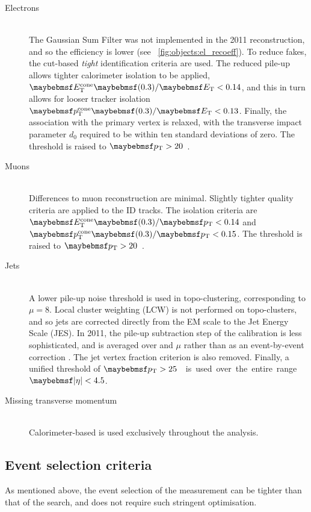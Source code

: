 \begin{description}
\item[Electrons] \hfill \\
	The Gaussian Sum Filter was not implemented in the 2011 reconstruction, and so the 
	efficiency is lower (see \Figure~\ref{fig:objects:el_recoeff}). To reduce fakes, the 
	cut-based \textit{tight} identification criteria are used. The reduced pile-up allows
	tighter calorimeter isolation to be applied, $\etcone{0.3}/\et < 0.14$, and this in 
	turn allows for looser tracker isolation $\ptcone{0.3}/\et < 0.13$. Finally, the 
	association with the primary vertex is relaxed, with the transverse impact parameter 
	$d_0$ required to be within ten standard deviations of zero. The threshold is raised 
	to \unit{$\pt > 20$}{\GeV}.

\item[Muons] \hfill \\
	Differences to muon reconstruction are minimal. Slightly tighter quality criteria are 
	applied to the ID tracks. The isolation criteria are $\etcone{0.3}/\pt < 0.14$ and 
	$\ptcone{0.3}/\pt < 0.15$. The threshold is raised to \unit{$\pt > 20$}{\GeV}.

\item[Jets] \hfill \\
	A lower pile-up noise threshold is used in topo-clustering, corresponding to 
	$\mu = 8$. Local cluster weighting (LCW) is not performed on topo-clusters, and so 
	jets are corrected directly from the EM scale to the Jet Energy Scale (JES). In 2011, 
	the pile-up subtraction step of the calibration is less sophisticated, and is 
	averaged over \npv and $\mu$ rather than as an event-by-event correction 
	\cite{Jets:PileupCorrection:2011}. The jet vertex fraction criterion is also removed. 
	Finally, a unified threshold of \unit{$\pt > 25$}{\GeV} is used over the entire 
	range $\mods{\eta} < 4.5$.

\item[Missing transverse momentum] \hfill \\
	Calorimeter-based \met is used exclusively throughout the analysis.

\end{description}



\subsection{Event selection criteria}

As mentioned above, the event selection of the \WW measurement can be tighter than that 
of the \HWW search, and does not require such stringent optimisation.

